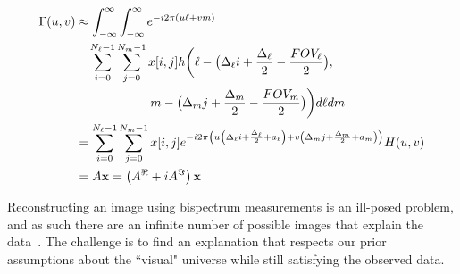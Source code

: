 		\begin{align}
		 \Gamma(u,v) &\approx \int_{- \infty}^{\infty}\int_{- \infty}^{\infty} {e^{-i 2 \pi  (u\ell + vm) }} 
		 \nonumber \\ & \quad \sum_{i=0}^{N_\ell-1}\sum_{j=0}^{N_m-1} x[i,j] 
		h \biggl(\ell- \bigl( \Delta_{\ell}i + \frac{\Delta_{\ell}}{2}  -\frac{FOV_\ell}{2} \bigr), \nonumber\\ 
		&  \qquad \qquad \qquad m- \bigl( \Delta_mj + \frac{\Delta_m}{2} -\frac{FOV_m}{2} \bigr) \biggl)  d\ell dm  
		\nonumber\\ &=  \sum_{i=0}^{N_\ell-1}{\sum_{j=0}^{N_m-1}  x[i,j] e^{-i 2 \pi \left(u  \left( \Delta_{\ell}i + \frac{\Delta_{\ell}}{2} + a_\ell \right) + v \left( \Delta_mj + \frac{\Delta_m}{2} + a_m \right)  \right)} H(u, v)} \nonumber\\ & = A {\bf x} = \left( A^{\Re} + i A^{\Im} \right) {\bf x}
		\label{eq:formodel}
		\end{align}
	
Reconstructing an image using bispectrum measurements is an ill-posed problem, and as such there are an infinite number of possible images that explain the data~\cite{rusenimaging}. 
The challenge is to find an explanation that respects our prior assumptions about the ``visual" universe
while still satisfying the observed data. 






